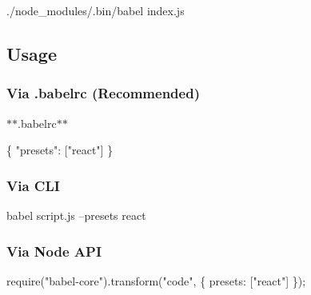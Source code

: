 \begin{DoxyCode}
./node\_modules/.bin/babel index.js
\end{DoxyCode}


\subsection*{Usage}

\subsubsection*{Via {\ttfamily .babelrc} (Recommended)}

$\ast$$\ast$.babelrc$\ast$$\ast$


\begin{DoxyCode}
\{
  "presets": ["react"]
\}
\end{DoxyCode}


\subsubsection*{Via C\+LI}


\begin{DoxyCode}
babel script.js --presets react 
\end{DoxyCode}


\subsubsection*{Via Node A\+PI}


\begin{DoxyCode}
require("babel-core").transform("code", \{
  presets: ["react"]
\});
\end{DoxyCode}
 